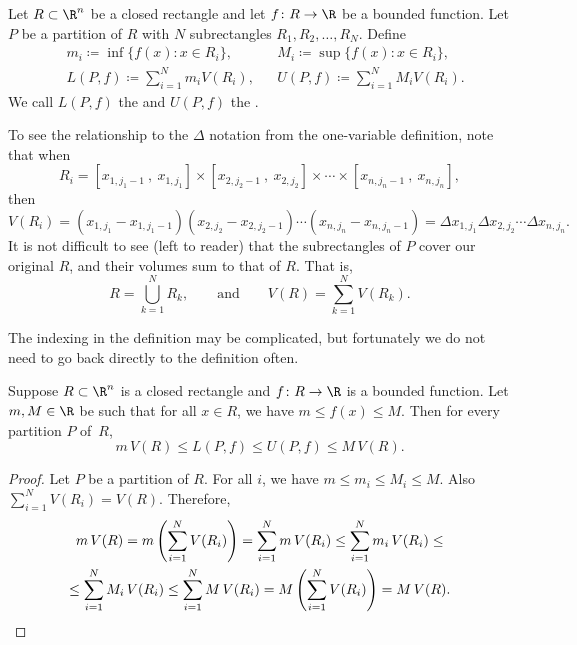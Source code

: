 \begin{defn}
Let $R \subset \R^n$ be a closed rectangle and
let $f \colon R \to \R$ be a bounded function.  Let $P$ be a partition of
$R$ with $N$ subrectangles $R_1,R_2,\ldots,R_N$.
Define
\begin{align*}
& m_i \coloneqq \inf \bigl\{ f(x) : x \in R_i \bigr\} , & 
& M_i \coloneqq \sup \bigl\{ f(x) : x \in R_i \bigr\} , \\
& L(P,f) \coloneqq
\sum_{i=1}^N m_i V(R_i) , &
& U(P,f) \coloneqq
\sum_{i=1}^N M_i V(R_i) .
\end{align*}
We call $L(P,f)$ the \emph{} and
$U(P,f)$ the \emph{}.
\end{defn}

To see the relationship to the $\Delta$ notation from the one-variable
definition, note that when
\begin{equation*}
R_i = [x_{1,j_1-1}~,~ x_{1,j_1}]
\times
[x_{2,j_2-1}~,~ x_{2,j_2}]
\times
\cdots
\times
[x_{n,j_n-1}~,~ x_{n,j_n}] ,
\end{equation*}
then
\begin{equation*}
V(R_i)
=
(x_{1,j_1}-x_{1,j_1-1})
(x_{2,j_2}-x_{2,j_2-1})
\cdots
(x_{n,j_n}-x_{n,j_n-1})
= 
\Delta x_{1,j_1}
\Delta x_{2,j_2}
\cdots
\Delta x_{n,j_n} .
\end{equation*}
It is not difficult to see (left to reader) that
the subrectangles of $P$ cover our original $R$, and their
volumes sum to that of $R$.  That is,
\begin{equation*}
R= \bigcup_{k=1}^N R_k , \qquad \text{and} \qquad
V(R) = \sum_{k=1}^N V(R_k).
\end{equation*}

The indexing in the definition may be complicated, but fortunately we
do not need to go back directly to the definition often.

\begin{prop} \label{mv:sumulbound:prop}
Suppose $R \subset \R^n$ is a closed rectangle
and $f \colon R \to \R$ is a bounded function.  Let $m, M \in \R$ be 
such that for all $x \in R$, we have $m \leq f(x) \leq M$.  Then for every partition
$P$ of~$R$,
\begin{equation*}
m \, V(R) \leq
L(P,f) \leq U(P,f)
\leq M\, V(R) .
\end{equation*}
\end{prop}

\begin{proof}
Let $P$ be a partition of $R$.  For all $i$, we have
$m \leq m_i \leq M_i \leq M$.  Also $\sum_{i=1}^N V(R_i) = V(R)$.  Therefore,
\begin{multline*}
m \, V(R) =
m \left( \sum_{i=1}^N V(R_i) \right)
=
\sum_{i=1}^N m \, V(R_i)
\leq
\sum_{i=1}^N m_i \, V(R_i)
\leq
\\
\leq
\sum_{i=1}^N M_i \, V(R_i)
\leq
\sum_{i=1}^N M \,V(R_i)
=
M \left( \sum_{i=1}^N V(R_i) \right)
=
M \,V(R) .  \qedhere
\end{multline*}
\end{proof}

